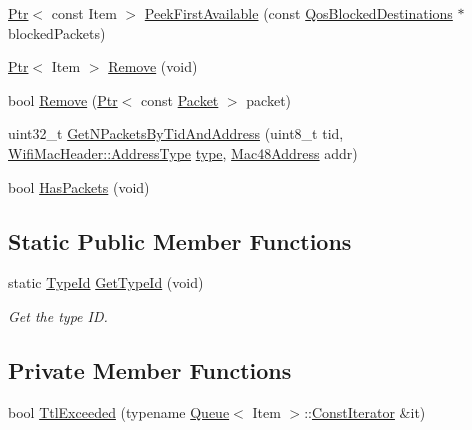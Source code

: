 \begin{DoxyCompactItemize}
\item 
\hyperlink{classns3_1_1Ptr}{Ptr}$<$ const Item $>$ \hyperlink{classns3_1_1WifiQueue_a7fa563e72d974b9200c17fc5d8afd41b}{Peek\+First\+Available} (const \hyperlink{classns3_1_1QosBlockedDestinations}{Qos\+Blocked\+Destinations} $\ast$blocked\+Packets)
\item 
\hyperlink{classns3_1_1Ptr}{Ptr}$<$ Item $>$ \hyperlink{classns3_1_1WifiQueue_a268b987d47e0e8b611557547c5104723}{Remove} (void)
\item 
bool \hyperlink{classns3_1_1WifiQueue_a430f2c6eb99315791dd316dbead9a9de}{Remove} (\hyperlink{classns3_1_1Ptr}{Ptr}$<$ const \hyperlink{classns3_1_1Packet}{Packet} $>$ packet)
\item 
uint32\+\_\+t \hyperlink{classns3_1_1WifiQueue_a1d4fcfe71ed2e341e97a315383aab695}{Get\+N\+Packets\+By\+Tid\+And\+Address} (uint8\+\_\+t tid, \hyperlink{classns3_1_1WifiMacHeader_a17406db48973a8e8fb6d961dd35154fe}{Wifi\+Mac\+Header\+::\+Address\+Type} \hyperlink{visualizer-ideas_8txt_add98db9e15e2a58cf2b57623e7aa893a}{type}, \hyperlink{classns3_1_1Mac48Address}{Mac48\+Address} addr)
\item 
bool \hyperlink{classns3_1_1WifiQueue_ab4a0e0f26d4b88534d8df601dc3cab97}{Has\+Packets} (void)
\end{DoxyCompactItemize}
\subsection*{Static Public Member Functions}
\begin{DoxyCompactItemize}
\item 
static \hyperlink{classns3_1_1TypeId}{Type\+Id} \hyperlink{classns3_1_1WifiQueue_a9741d8376010aec96a05bf237db14a82}{Get\+Type\+Id} (void)
\begin{DoxyCompactList}\small\item\em Get the type ID. \end{DoxyCompactList}\end{DoxyCompactItemize}
\subsection*{Private Member Functions}
\begin{DoxyCompactItemize}
\item 
bool \hyperlink{classns3_1_1WifiQueue_a6a90562f553a5938725afc0c77a88dc7}{Ttl\+Exceeded} (typename \hyperlink{classns3_1_1Queue}{Queue}$<$ Item $>$\+::\hyperlink{classns3_1_1Queue_af108d00696b556f3b3addd8816413119}{Const\+Iterator} \&it)
\end{DoxyCompactItemize}
